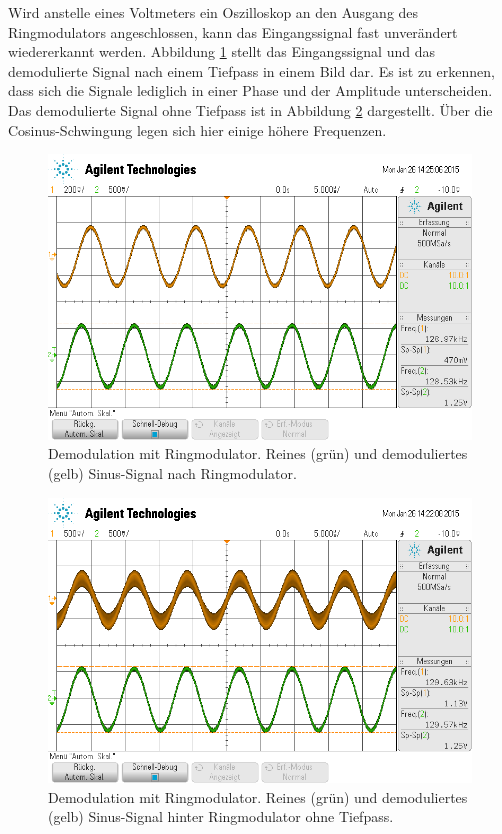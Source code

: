 Wird anstelle eines Voltmeters ein Oszilloskop an den Ausgang des
Ringmodulators angeschlossen, kann das Eingangssignal fast unverändert
wiedererkannt werden.
Abbildung \ref{fig:am-demoduliert} stellt das Eingangssignal und das
demodulierte Signal nach einem Tiefpass in einem Bild dar.
Es ist zu erkennen, dass sich die Signale lediglich in einer Phase
und der Amplitude unterscheiden.
Das demodulierte Signal ohne Tiefpass ist in Abbildung \ref{fig:am-kein-tp}
dargestellt. Über die Cosinus-Schwingung legen sich hier einige höhere
Frequenzen.
\begin{figure}
    \centering
    \includegraphics[width=0.8\linewidth]{images/am-demoduliert.png}
    \caption{Demodulation mit Ringmodulator. Reines (grün) und demoduliertes (gelb) Sinus-Signal nach
    Ringmodulator.}
    \label{fig:am-demoduliert}
\end{figure}
\begin{figure}
    \centering
    \includegraphics[width=0.8\linewidth]{images/am-kein-tp.png}
    \caption{Demodulation mit Ringmodulator. Reines (grün) und demoduliertes (gelb) Sinus-Signal hinter
    Ringmodulator ohne Tiefpass.}
    \label{fig:am-kein-tp}
\end{figure}

